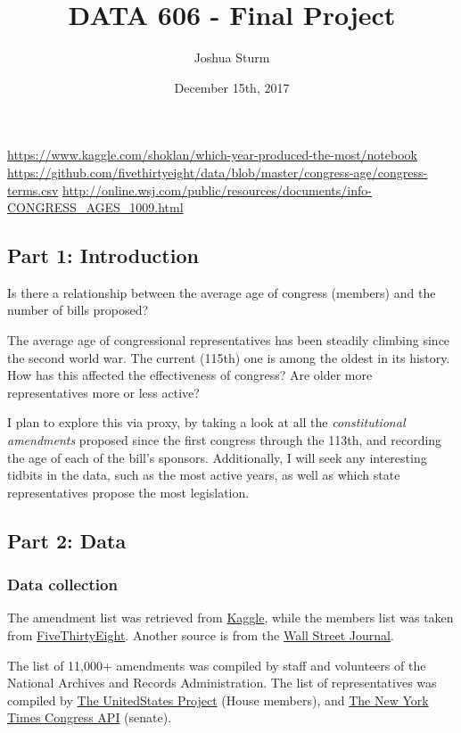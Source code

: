 \documentclass[]{article}
\title{DATA 606 - Final Project}
\author{Joshua Sturm}
\date{December 15th, 2017}
\begin{document}
\maketitle

\url{https://www.kaggle.com/shoklan/which-year-produced-the-most/notebook}
\url{https://github.com/fivethirtyeight/data/blob/master/congress-age/congress-terms.csv}
\url{http://online.wsj.com/public/resources/documents/info-CONGRESS_AGES_1009.html}

\subsection{Part 1: Introduction}\label{part-1-introduction}

Is there a relationship between the average age of congress (members)
and the number of bills proposed?

The average age of congressional representatives has been steadily
climbing since the second world war. The current (115th) one is among
the oldest in its history. How has this affected the effectiveness of
congress? Are older more representatives more or less active?

I plan to explore this via proxy, by taking a look at all the
\emph{constitutional amendments} proposed since the first congress
through the 113th, and recording the age of each of the bill's sponsors.
Additionally, I will seek any interesting tidbits in the data, such as
the most active years, as well as which state representatives propose
the most legislation.

\subsection{Part 2: Data}\label{part-2-data}

\subsubsection{Data collection}\label{data-collection}

The amendment list was retrieved from
\href{https://www.kaggle.com/national-archives/amending-america/data}{Kaggle},
while the members list was taken from
\href{https://github.com/fivethirtyeight/data/tree/master/congress-age}{FiveThirtyEight}.
Another source is from the
\href{http://online.wsj.com/public/resources/documents/info-CONGRESS_AGES_1009.html}{Wall
Street Journal}.

The list of 11,000+ amendments was compiled by staff and volunteers of
the National Archives and Records Administration. The list of
representatives was compiled by \href{https://theunitedstates.io/}{The
UnitedStates Project} (House members), and
\href{https://developer.nytimes.com/}{The New York Times Congress API}
(senate).
\end{document}
